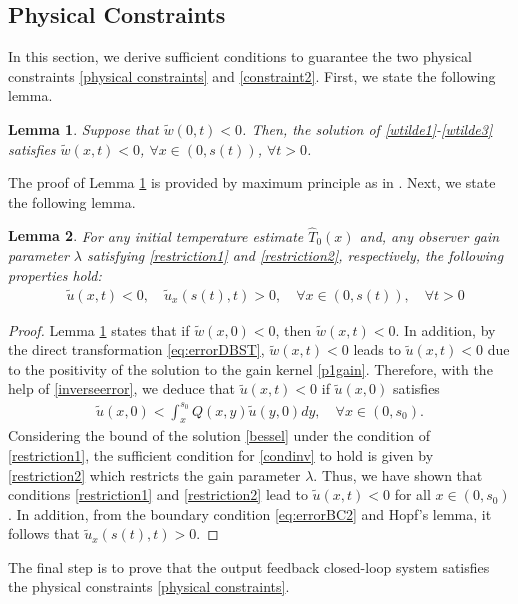 \documentclass[journal]{IEEEtran}
\newtheorem{lem}{Lemma}
\begin{document}
\subsection{Physical Constraints}\label{sec:constraints}
In this section, we derive sufficient conditions to guarantee the two physical constraints \eqref{physical constraints} and \eqref{constraint2}. First, we state the following lemma. 
\begin{lem}\label{wmaximum}
Suppose that $\tilde{w}(0,t)<0$. Then, the solution of \eqref{wtilde1}-\eqref{wtilde3} satisfies $\tilde{w}(x,t)<0$, $\forall x\in(0,s(t))$, $\forall t>0$.
\end{lem}
The proof of Lemma \ref{wmaximum} is provided by maximum principle as in \cite{nonlinearPDE}.  Next, we state the following lemma. 
\begin{lem}\label{maximum}
For any   initial temperature estimate  $\hat{T}_0(x)$ and, any observer gain parameter $\lambda$  satisfying  \eqref{restriction1} and \eqref{restriction2}, respectively, the following properties hold:
\begin{align}\label{positive}
 &\tilde{u}(x,t) < 0, \quad \tilde{u}_{x}(s(t),t) > 0, \quad \forall x\in(0,s(t)), \quad \forall t>0
\end{align}
\end{lem}
\begin{proof}
Lemma \ref{wmaximum} states that if $\tilde{w}(x,0)<0$, then $\tilde{w}(x,t)<0$. In addition, by the direct transformation \eqref{eq:errorDBST}, $\tilde{w}(x,t)<0$ leads to $\tilde{u}(x,t)<0$ due to the positivity of the solution to the gain kernel \eqref{p1gain}. Therefore, with the help of \eqref{inverseerror}, we deduce that $\tilde{u}(x,t)<0$ if $\tilde{u}(x,0)$ satisfies 
\begin{align}\label{condinv}
 \tilde{u}(x,0) < \int_{x}^{s_0} Q(x,y) \tilde{u}(y,0) dy, \quad \forall x\in(0,s_0). 
\end{align}
Considering the bound of the solution \eqref{bessel} under the condition of \eqref{restriction1}, the sufficient condition for \eqref{condinv} to hold is given by \eqref{restriction2} which restricts the gain parameter $\lambda$. Thus, we have shown that conditions \eqref{restriction1} and \eqref{restriction2} lead to $\tilde{u}(x,t)<0$ for all $ x\in(0,s_0)$. In addition, from the  boundary condition \eqref{eq:errorBC2} and Hopf's lemma, it follows that $\tilde{u}_{x}(s(t),t)>0$. 
\end{proof}

The final step is to prove that the output feedback closed-loop system satisfies the physical constraints \eqref{physical constraints}.  
\end{document}
